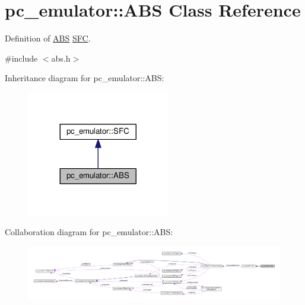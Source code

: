 \hypertarget{classpc__emulator_1_1ABS}{}\section{pc\+\_\+emulator\+:\+:A\+BS Class Reference}
\label{classpc__emulator_1_1ABS}


Definition of \hyperlink{classpc__emulator_1_1ABS}{A\+BS} \hyperlink{classpc__emulator_1_1SFC}{S\+FC}.  




{\ttfamily \#include $<$abs.\+h$>$}



Inheritance diagram for pc\+\_\+emulator\+:\+:A\+BS\+:
\nopagebreak
\begin{figure}[H]
\begin{center}
\leavevmode
\includegraphics[width=176pt]{classpc__emulator_1_1ABS__inherit__graph}
\end{center}
\end{figure}


Collaboration diagram for pc\+\_\+emulator\+:\+:A\+BS\+:
\nopagebreak
\begin{figure}[H]
\begin{center}
\leavevmode
\includegraphics[width=350pt]{classpc__emulator_1_1ABS__coll__graph}
\end{center}
\end{figure}
